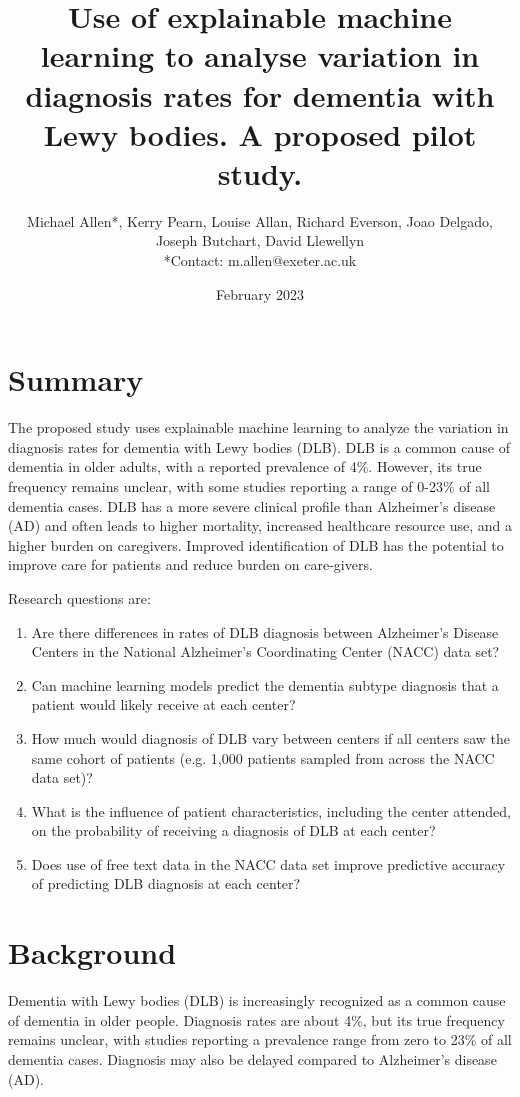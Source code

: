 \documentclass{article}
\title{Use of explainable machine learning to analyse variation in diagnosis rates for dementia with Lewy bodies. A proposed pilot study.}
\author{Michael Allen*, Kerry Pearn, Louise Allan, Richard Everson, Joao Delgado, Joseph Butchart, David Llewellyn\\

\footnotesize{*Contact: m.allen@exeter.ac.uk}}
\date{February 2023}
\begin{document}
\maketitle

\section*{Summary}

The proposed study uses explainable machine learning to analyze the variation in diagnosis rates for dementia with Lewy bodies (DLB). DLB is a common cause of dementia in older adults, with a reported prevalence of 4\%. However, its true frequency remains unclear, with some studies reporting a range of 0-23\% of all dementia cases. DLB has a more severe clinical profile than Alzheimer’s disease (AD) and often leads to higher mortality, increased healthcare resource use, and a higher burden on caregivers. Improved identification of DLB has the potential to improve care for patients and reduce burden on care-givers.

Research questions are:

\begin{enumerate}
    \item Are there differences in rates of DLB diagnosis between Alzheimer’s Disease Centers in the National Alzheimer’s Coordinating Center (NACC) data set?
    \item Can machine learning models predict the dementia subtype diagnosis that a patient would likely receive at each center?
    \item How much would diagnosis of DLB vary between centers if all centers saw the same cohort of patients (e.g. 1,000 patients sampled from across the NACC data set)?
    \item What is the influence of patient characteristics, including the center attended, on the probability of receiving a diagnosis of DLB at each center?
    \item Does use of free text data in the NACC data set improve predictive accuracy of predicting DLB diagnosis at each center?
\end{enumerate}

\newpage

\section{Background}

Dementia with Lewy bodies (DLB) is increasingly recognized as a common cause of dementia in older people. Diagnosis rates are about 4\%, but its true frequency remains unclear, with studies reporting a prevalence range from zero to 23\% of all dementia cases\cite{jones_prevalence_2014}. Diagnosis may also be delayed compared to Alzheimer’s disease (AD)\cite{zweig_lewy_2014}.
\end{document}
